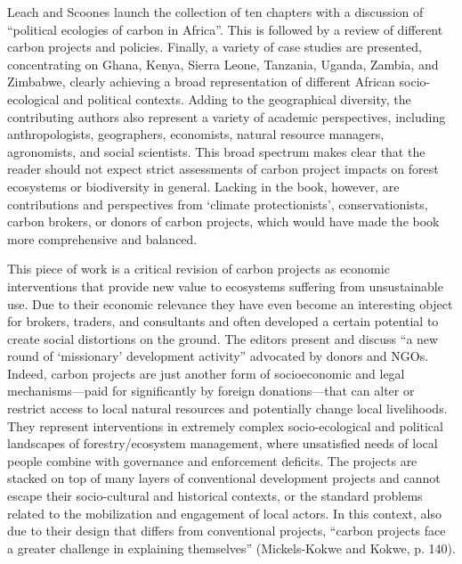 \documentclass[10pt,a4paper]{article}
\begin{document}
\begin{multicols}{2}
Leach and Scoones launch the collection of ten chapters with a discussion of ``political ecologies of carbon in Africa''. This is followed by a review of different carbon projects and policies. Finally, a variety of case studies are presented, concentrating on Ghana, Kenya, Sierra Leone, Tanzania, Uganda, Zambia, and Zimbabwe, clearly achieving a broad representation of different African socio-ecological and political contexts. Adding to the geographical diversity, the contributing authors also represent a variety of academic perspectives, including anthropologists, geographers, economists, natural resource managers, agronomists, and social scientists. This broad spectrum makes clear that the reader should not expect strict assessments of carbon project impacts on forest ecosystems or biodiversity in general. Lacking in the book, however, are contributions and perspectives from `climate protectionists', conservationists, carbon brokers, or donors of carbon projects, which would have made the book more comprehensive and balanced.

This piece of work is a critical revision of carbon projects as economic interventions that provide new value to ecosystems suffering from unsustainable use. Due to their economic relevance they have even become an interesting object for brokers, traders, and consultants and often developed a certain potential to create social distortions on the ground. The editors present and discuss ``a new round of `missionary' development activity'' advocated by donors and NGOs. Indeed, carbon projects are just another form of socioeconomic and legal mechanisms---paid for significantly by foreign donations---that can alter or restrict access to local natural resources and potentially change local livelihoods. They represent interventions in extremely complex socio-ecological and political landscapes of forestry/ecosystem management, where unsatisfied needs of local people combine with governance and enforcement deficits. The projects are stacked on top of many layers of conventional development projects and cannot escape their socio-cultural and historical contexts, or the standard problems related to the mobilization and engagement of local actors. In this context, also due to their design that differs from conventional projects, ``carbon projects face a greater challenge in explaining themselves'' (Mickels-Kokwe and Kokwe, p. 140). 


\end{multicols}
\end{document}

